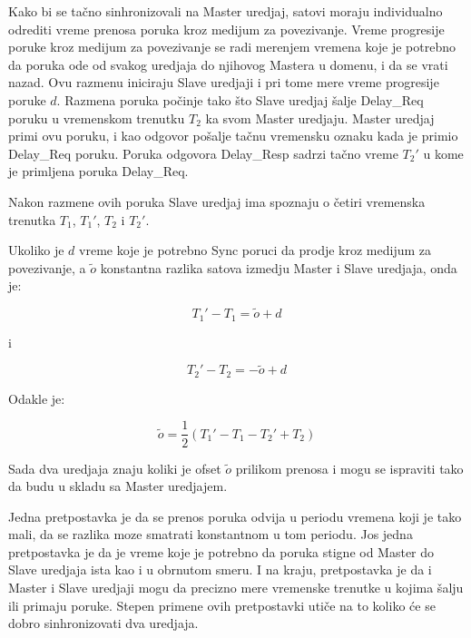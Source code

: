 \documentclass[a4paper,12pt, master]{etf}
\begin{document}
	Kako bi se ta\v{c}no sinhronizovali na Master uredjaj, satovi moraju individualno odrediti
	vreme prenosa poruka kroz medijum za povezivanje. Vreme progresije poruke kroz medijum za
	povezivanje	se radi merenjem vremena koje je potrebno da poruka ode od svakog uredjaja do
	njihovog Mastera u domenu, i da se vrati nazad. Ovu razmenu iniciraju Slave uredjaji i pri
        tome mere vreme progresije poruke $d$. Razmena poruka po\v{c}inje tako \v{s}to Slave uredjaj
        \v{s}alje Delay\_Req poruku u vremenskom trenutku $T_2$ ka svom Master uredjaju. Master uredjaj
	primi ovu poruku, i kao	odgovor po\v{s}alje ta\v{c}nu vremensku oznaku kada je primio Delay\_Req
	poruku. Poruka odgovora	Delay\_Resp sadrzi ta\v{c}no vreme $T_2'$ u kome je primljena poruka
	Delay\_Req.

	Nakon razmene ovih poruka Slave uredjaj ima spoznaju o \v{c}etiri vremenska trenutka $T_1$,
	$T_1'$,	$T_2$ i $T_2'$.

	Ukoliko je $d$ vreme koje je potrebno Sync poruci da prodje kroz medijum za povezivanje, a
        $\tilde{o}$ konstantna razlika satova izmedju Master i Slave uredjaja, onda je:

	\begin{equation}
		T_1' - T_1 = \tilde{o} + d
	\end{equation}

	i

	\begin{equation}
			T_2' - T_2 = -\tilde{o} + d
	\end{equation}

	Odakle je:

	\begin{equation}
		\tilde{o} = \frac{1}{2} (T_1' - T_1 - T_2' + T_2)
	\end{equation}

	Sada dva uredjaja znaju koliki je ofset $\tilde{o}$ prilikom prenosa i mogu se ispraviti
	tako da budu u skladu sa Master uredjajem.

	Jedna pretpostavka je da se prenos poruka odvija u periodu vremena koji je tako mali, da se
	razlika moze smatrati konstantnom u tom periodu. Jos jedna pretpostavka je da je vreme
	koje je	potrebno da poruka stigne od Master do Slave uredjaja ista kao i u obrnutom smeru.
	I na kraju, pretpostavka je da i Master i Slave uredjaji mogu da precizno mere vremenske
        trenutke u kojima \v{s}alju ili primaju poruke. Stepen primene ovih pretpostavki uti\v{c}e
        na to koliko \'{c}e se dobro sinhronizovati dva uredjaja.
\end{document}
